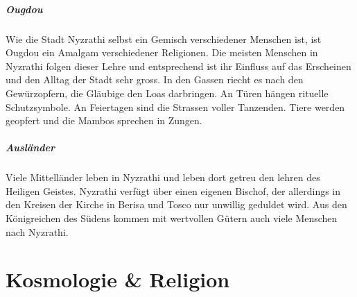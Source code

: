 \documentclass[12pt,twoside,twocolumn,openany]{book}
\begin{document}
\paragraph{Ougdou} Wie die Stadt Nyzrathi selbst ein Gemisch verschiedener Menschen ist, ist Ougdou ein Amalgam verschiedener Religionen. Die meisten Menschen in Nyzrathi folgen dieser Lehre und entsprechend ist ihr Einfluss auf das Erscheinen und den Alltag der Stadt sehr gross. In den Gassen riecht es nach den Gewürzopfern, die Gläubige den Loas darbringen. An Türen hängen rituelle Schutzsymbole. An Feiertagen sind die Strassen voller Tanzenden. Tiere werden geopfert und die Mambos sprechen in Zungen.

\paragraph{Ausländer} Viele Mittelländer leben in Nyzrathi und leben dort getreu den lehren des Heiligen Geistes. Nyzrathi verfügt über einen eigenen Bischof, der allerdings in den Kreisen der Kirche in Berisa und Tosco nur unwillig geduldet wird. Aus den Königreichen des Südens kommen mit wertvollen Gütern auch viele Menschen nach Nyzrathi.


%
%	
%
%



\chapter{Kosmologie \& Religion}
\end{document}
